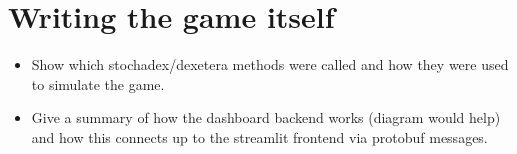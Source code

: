 \section{\sffamily Writing the game itself}

\begin{itemize}
\item{Show which stochadex/dexetera methods were called and how they were used to simulate the game.}
\item{Give a summary of how the dashboard backend works (diagram would help) and how this connects up to the streamlit frontend via protobuf messages.}
\end{itemize}